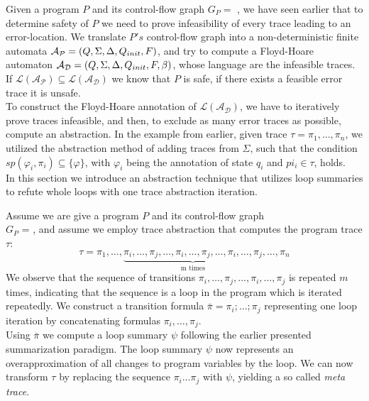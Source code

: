 
Given a program $P$ and its control-flow graph $G_P = $ \cfg, we have seen earlier that to determine safety of $P$ we need to prove infeasibility of every trace leading to an error-location. We translate $P's$ control-flow graph into a non-deterministic finite automata $\mathcal{A_{P}} = (Q, \Sigma, \Delta, Q_{init}, F)$, and try to compute a Floyd-Hoare automaton $\mathcal{A_{D}} = (Q, \Sigma, \Delta, Q_{init}, F, \beta)$, whose language are the infeasible traces. If $\mathcal{L(A_P)} \subseteq \mathcal{L(A_D)}$ we know that $P$ is safe, if there exists a feasible error trace it is unsafe. \\ To construct the Floyd-Hoare annotation of $\mathcal{L(A_D)}$, we have to iteratively prove traces infeasible, and then, to exclude as many error traces as possible, compute an abstraction. In the example from earlier, given trace $\tau = \pi_1, \ldots, \pi_n$, we utilized the abstraction method of adding traces from $\Sigma$, such that the condition $sp(\varphi_i, \pi_i) \subseteq \{\varphi\}$, with $\varphi_i$ being the annotation of state $q_i$ and $pi_i \in \tau$, holds. \\
In this section we introduce an abstraction technique that utilizes loop summaries to refute whole loops with one trace abstraction iteration. \par
Assume we are give a program $P$ and its control-flow graph \\ $G_P$ = \cfg, and assume we employ trace abstraction that computes the program trace $\tau$:
\begin{equation*}
	\tau = \pi_1, \ldots, \underbrace{\pi_i, \ldots, \pi_j, \ldots, \pi_i, \ldots, \pi_j, \ldots, \pi_i, \ldots, \pi_j}_{\text{m times}}, \ldots, \pi_n
\end{equation*}
We observe that the sequence of transitions $\pi_i, \ldots, \pi_j, \ldots, \pi_i, \ldots, \pi_j$ is repeated $m$ times, indicating that the sequence is a loop in the program which is iterated repeatedly. We construct a transition formula $\bar{\pi} = \pi_i; \ldots; \pi_j$ representing one loop iteration by concatenating formulas $\pi_i, \ldots, \pi_j$. \\
Using $\bar{\pi}$ we compute a \qvasr loop summary $\psi$ following the earlier presented summarization paradigm. The loop summary $\psi$ now represents an overapproximation of all changes to program variables by the loop. We can now transform $\tau$ by replacing the sequence $\pi_i \ldots \pi_j$ with $\psi$, yielding a so called \textsl{meta trace}.

